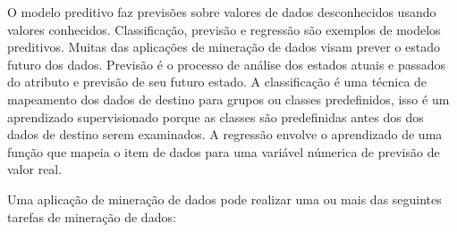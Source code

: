 O modelo preditivo faz previsões sobre valores de dados desconhecidos usando valores conhecidos. Classificação, previsão e regressão são exemplos de modelos preditivos. Muitas das aplicações de mineração de dados visam prever o estado futuro dos dados. Previsão é o processo de análise dos estados atuais e passados do atributo e previsão de seu futuro estado. A classificação é uma técnica de mapeamento dos dados de destino para grupos ou classes predefinidos, isso é um aprendizado supervisionado porque as classes são predefinidas antes dos dos dados de destino serem examinados. A regressão envolve o aprendizado de uma função que mapeia o item de dados para uma variável númerica de previsão de valor real.

Uma aplicação de mineração de dados pode realizar uma ou mais das seguintes tarefas de mineração de dados:

